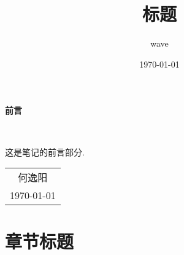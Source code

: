 \documentclass[12pt, a4paper, oneside]{ctexbook}
\title{{\Huge{\textbf{标题}}}}
\author{wave}
\date{\today}
\newcounter{#2}
\newcounter{#2}[#1]
\numberwithin{#2}{#1}
\begin{document}
      \renewcommand*{\psvectorianDefaultColor}{pscol}%
    
      \maketitle
    
      \setcounter{page}{1}
    
      \begin{center}
        \Huge\textbf{前言}
      \end{center}~\
    
      这是笔记的前言部分.
      ~\\
      \begin{flushright}
        \begin{tabular}{c}
          何逸阳 \\
          \today
        \end{tabular}
      \end{flushright}
    
      \newpage
      \setcounter{page}{1}
      \tableofcontents
      \newpage
      \setcounter{page}{1}
    
      \chapter{章节标题}
    
\end{document}
